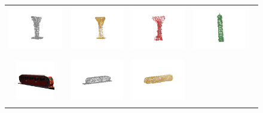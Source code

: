 \documentclass[bachelor, nocolorlinks, printoneside]{seuthesis} %
\begin{document}
\begin{Appendix}{}
\begin{figure}[!h]
\begin{tabular}{c@{}c@{}c@{}c@{}c@{}}
            \includegraphics[width=0.18\columnwidth,height=2cm]{figs/supp_real_dataset/GT/tower_f584f1a14904b958ba9419f3b43eb3bd_gt.png} &
            \includegraphics[width=0.18\columnwidth,height=2cm]{figs/supp_real_dataset/AE_label/tower_f584f1a14904b958ba9419f3b43eb3bd_label.png} &
            \includegraphics[width=0.18\columnwidth,height=2cm]{figs/supp_real_dataset/AE/tower_f584f1a14904b958ba9419f3b43eb3bd_pred.png} &
            \includegraphics[width=0.18\columnwidth,height=2cm]{figs/supp_real_dataset/oracle/tower_f584f1a14904b958ba9419f3b43eb3bd_oracle.png} \\
            \vspace{-5mm}
            \includegraphics[width=0.11\columnwidth,height=1.7cm]{figs/supp_real_dataset/Image/train_537decdce3079c857addcf2661f94d39.png} &
            \includegraphics[width=0.18\columnwidth,height=2cm]{figs/supp_real_dataset/GT/train_537decdce3079c857addcf2661f94d39_gt.png} &
            \includegraphics[width=0.18\columnwidth,height=2cm]{figs/supp_real_dataset/AE_label/train_537decdce3079c857addcf2661f94d39_label.png} &

\end{tabular}
\end{figure}
\end{Appendix}
\end{document}

